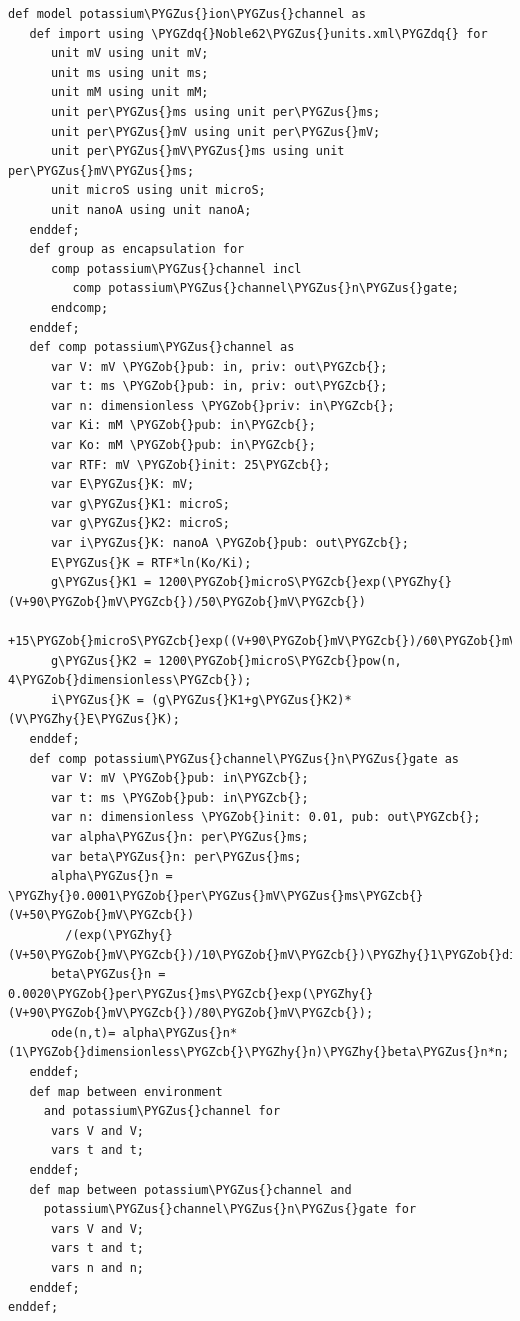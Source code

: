 \documentclass[a4paper,10pt,english]{sphinxmanual}
\def\PYGZus{\char`\_}
\def\PYGZob{\char`\{}
\def\PYGZcb{\char`\}}
\def\PYGZhy{\char`\-}
\def\PYGZdq{\char`\"}
\begin{document}
\begin{Verbatim}[commandchars=\\\{\}]
def model potassium\PYGZus{}ion\PYGZus{}channel as
   def import using \PYGZdq{}Noble62\PYGZus{}units.xml\PYGZdq{} for
      unit mV using unit mV;
      unit ms using unit ms;
      unit mM using unit mM;
      unit per\PYGZus{}ms using unit per\PYGZus{}ms;
      unit per\PYGZus{}mV using unit per\PYGZus{}mV;
      unit per\PYGZus{}mV\PYGZus{}ms using unit per\PYGZus{}mV\PYGZus{}ms;
      unit microS using unit microS;
      unit nanoA using unit nanoA;
   enddef;
   def group as encapsulation for
      comp potassium\PYGZus{}channel incl
         comp potassium\PYGZus{}channel\PYGZus{}n\PYGZus{}gate;
      endcomp;
   enddef;
   def comp potassium\PYGZus{}channel as
      var V: mV \PYGZob{}pub: in, priv: out\PYGZcb{};
      var t: ms \PYGZob{}pub: in, priv: out\PYGZcb{};
      var n: dimensionless \PYGZob{}priv: in\PYGZcb{};
      var Ki: mM \PYGZob{}pub: in\PYGZcb{};
      var Ko: mM \PYGZob{}pub: in\PYGZcb{};
      var RTF: mV \PYGZob{}init: 25\PYGZcb{};
      var E\PYGZus{}K: mV;
      var g\PYGZus{}K1: microS;
      var g\PYGZus{}K2: microS;
      var i\PYGZus{}K: nanoA \PYGZob{}pub: out\PYGZcb{};
      E\PYGZus{}K = RTF*ln(Ko/Ki);
      g\PYGZus{}K1 = 1200\PYGZob{}microS\PYGZcb{}exp(\PYGZhy{}(V+90\PYGZob{}mV\PYGZcb{})/50\PYGZob{}mV\PYGZcb{})
        +15\PYGZob{}microS\PYGZcb{}exp((V+90\PYGZob{}mV\PYGZcb{})/60\PYGZob{}mV\PYGZcb{});
      g\PYGZus{}K2 = 1200\PYGZob{}microS\PYGZcb{}pow(n, 4\PYGZob{}dimensionless\PYGZcb{});
      i\PYGZus{}K = (g\PYGZus{}K1+g\PYGZus{}K2)*(V\PYGZhy{}E\PYGZus{}K);
   enddef;
   def comp potassium\PYGZus{}channel\PYGZus{}n\PYGZus{}gate as
      var V: mV \PYGZob{}pub: in\PYGZcb{};
      var t: ms \PYGZob{}pub: in\PYGZcb{};
      var n: dimensionless \PYGZob{}init: 0.01, pub: out\PYGZcb{};
      var alpha\PYGZus{}n: per\PYGZus{}ms;
      var beta\PYGZus{}n: per\PYGZus{}ms;
      alpha\PYGZus{}n = \PYGZhy{}0.0001\PYGZob{}per\PYGZus{}mV\PYGZus{}ms\PYGZcb{}(V+50\PYGZob{}mV\PYGZcb{})
        /(exp(\PYGZhy{}(V+50\PYGZob{}mV\PYGZcb{})/10\PYGZob{}mV\PYGZcb{})\PYGZhy{}1\PYGZob{}dimensionless\PYGZcb{});
      beta\PYGZus{}n = 0.0020\PYGZob{}per\PYGZus{}ms\PYGZcb{}exp(\PYGZhy{}(V+90\PYGZob{}mV\PYGZcb{})/80\PYGZob{}mV\PYGZcb{});
      ode(n,t)= alpha\PYGZus{}n*(1\PYGZob{}dimensionless\PYGZcb{}\PYGZhy{}n)\PYGZhy{}beta\PYGZus{}n*n;
   enddef;
   def map between environment
     and potassium\PYGZus{}channel for
      vars V and V;
      vars t and t;
   enddef;
   def map between potassium\PYGZus{}channel and
     potassium\PYGZus{}channel\PYGZus{}n\PYGZus{}gate for
      vars V and V;
      vars t and t;
      vars n and n;
   enddef;
enddef;
\end{Verbatim}
\end{document}

